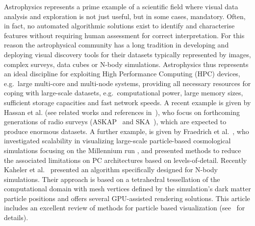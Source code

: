 \documentclass[preprint,5pt]{elsarticle}
\begin{document}
Astrophysics represents a prime example of a scientific field where visual data analysis and exploration is not just useful, but in some cases, mandatory. Often, in fact, no automated algorithmic solutions exist to identify and characterise features without requiring human assessment for correct interpretation. For this reason the astrophysical community has a long tradition in developing and deploying visual discovery tools for their datasets typically represented by images, complex surveys, data cubes or N-body simulations. Astrophysics thus represents an ideal discipline for exploiting High Performance Computing (HPC) devices, e.g.\ large multi-core and multi-node systems, providing all necessary resources for coping with large-scale datasets, e.g.\ computational power, large memory sizes, sufficient storage capacities and fast network speeds. A recent example is given by Hassan et al. (see related works and references in~\cite{2012ASPC..461...45H}), who focus on forthcoming generations of radio surveys (ASKAP~\cite{askap} and SKA~\cite{ska}), which are expected to produce enormous datasets. A further example, is given by Fraedrich et al.~\cite{Fraedrich:2009:TMV}, who
investigated scalability in visualizing large-scale particle-based cosmological 
simulations focusing on the Millennium run \cite{millennium}, and presented methods to reduce the associated limitations on PC architectures based on levels-of-detail.
Recently Kaheler et al.~\cite{2012arXiv1208.3206K} presented an algorithm specifically designed for N-body simulations. Their approach is based on a tetrahedral tessellation of the computational domain with mesh vertices defined by the simulation's dark matter particle positions and offers several GPU-assisted rendering solutions. This article includes an excellent review of methods for particle based visualization (see~\cite{2012arXiv1208.3206K} for details).
\end{document}
